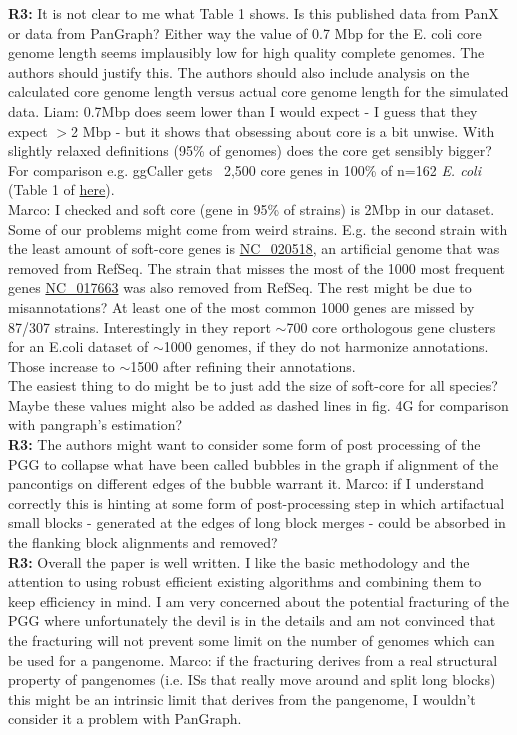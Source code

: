 \documentclass[aps,rmp,onecolumn]{revtex4-1}
\newcommand{\Marco}[1]{{\color{gray}Marco: #1}}
\newcommand{\Liam}[1]{{\color{teal}Liam: #1}}
\newcommand{\reviewer}[2]{\textbf{#1:} #2\vskip 5mm}
\begin{document}
\reviewer{R3}{It is not clear to me what Table 1 shows. Is this published data from PanX or data from PanGraph? Either way the value of 0.7 Mbp for the E. coli core genome length seems implausibly low for high quality complete genomes. The authors should justify this. The authors should also include analysis on the calculated core genome length versus actual core genome length for the simulated data.}
\Liam{0.7Mbp does seem lower than I would expect - I guess that they expect $>$2 Mbp - but it shows that obsessing about core is a bit unwise. With slightly relaxed definitions (95\% of genomes) does the core get sensibly bigger? For comparison e.g. ggCaller gets ~2,500 core genes in 100\% of n=162 \textit{E. coli} (Table 1 of \href{https://www.biorxiv.org/content/10.1101/2023.01.24.524926v1.full.pdf}{here}).}\\
\Marco{I checked and soft core (gene in 95\% of strains) is 2Mbp in our dataset. Some of our problems might come from weird strains. E.g. the second strain with the least amount of soft-core genes is \href{https://www.ncbi.nlm.nih.gov/nuccore/NC_020518.1?report=genbank}{NC\_020518}, an artificial genome that was removed from RefSeq. The strain that misses the most of the 1000 most frequent genes \href{https://www.ncbi.nlm.nih.gov/nuccore/NC_017663.1?report=genbank}{NC\_017663} was also removed from RefSeq. The rest might be due to misannotations? At least one of the most common 1000 genes are missed by 87/307 strains. Interestingly in \cite{sutton2021pan} they report $\sim$700 core orthologous gene clusters for an E.coli dataset of $\sim$1000 genomes, if they do not harmonize annotations. Those increase to $\sim$1500 after refining their annotations.\\
      The easiest thing to do might be to just add the size of soft-core for all species? Maybe these values might also be added as dashed lines in fig. 4G for comparison with pangraph's estimation?}\\
\reviewer{R3}{The authors might want to consider some form of post processing of the PGG to collapse what have been called bubbles in the graph if alignment of the pancontigs on different edges of the bubble warrant it.}
\Marco{if I understand correctly this is hinting at some form of post-processing step in which artifactual small blocks - generated at the edges of long block merges - could be absorbed in the flanking block alignments and removed?}\\

\reviewer{R3}{Overall the paper is well written. I like the basic methodology and the attention to using robust efficient existing algorithms and combining them to keep efficiency in mind. I am very concerned about the potential fracturing of the PGG where unfortunately the devil is in the details and am not convinced that the fracturing will not prevent some limit on the number of genomes which can be used for a pangenome.}
\Marco{if the fracturing derives from a real structural property of pangenomes (i.e. ISs that really move around and split long blocks) this might be an intrinsic limit that derives from the pangenome, I wouldn't consider it a problem with PanGraph.}\\
\end{document}
